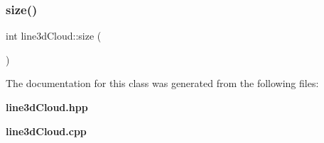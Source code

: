 \mbox{\label{classline3d_cloud_abcfeacb27285def2412a526a4b1ebcfb}} 
\subsubsection{size()}
{\footnotesize\ttfamily int line3d\+Cloud\+::size (\begin{DoxyParamCaption}{ }\end{DoxyParamCaption})}



The documentation for this class was generated from the following files\+:\begin{DoxyCompactItemize}
\item 
\textbf{ line3d\+Cloud.\+hpp}\item 
\textbf{ line3d\+Cloud.\+cpp}\end{DoxyCompactItemize}

